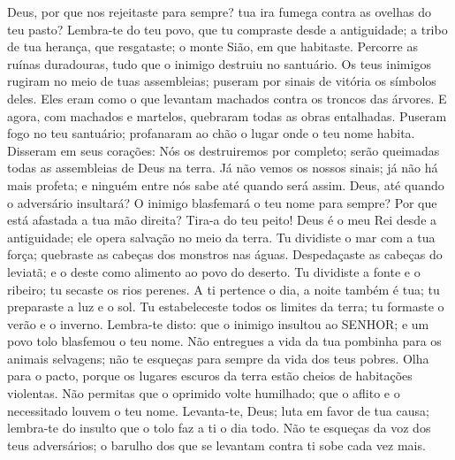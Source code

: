 
{\PP 
  Deus, por que nos rejeitaste para sempre?
{} tua ira fumega contra as ovelhas do teu pasto?
  Lembra-te do teu povo,
 que tu compraste desde a antiguidade; a tribo de tua herança, que resgataste; o monte Sião, em que habitaste.
  Percorre
 as ruínas duradouras, tudo que o inimigo destruiu no santuário.
  Os teus inimigos rugiram no meio de tuas assembleias; puseram por sinais de vitória os símbolos deles.
  Eles eram como o que levantam machados contra os troncos das árvores.
  E agora, com machados e martelos, quebraram todas as obras entalhadas.
  Puseram fogo no teu santuário; profanaram
{} ao chão o lugar onde o teu nome habita.
  Disseram em seus corações: Nós os destruiremos por completo; serão queimadas todas as assembleias de Deus na terra.
  Já não vemos os nossos sinais; já não há mais profeta; e ninguém entre nós sabe até quando será assim.
  Deus, até quando o adversário insultará? O inimigo blasfemará o teu nome para sempre?
  Por que está afastada a tua mão direita? Tira-a do teu peito!
  Deus é o meu Rei desde a antiguidade; ele opera salvação no meio da terra.
  Tu dividiste o mar com a tua força; quebraste as cabeças dos monstros nas águas.
  Despedaçaste as cabeças do leviatã; e o deste como alimento ao povo do deserto.
  Tu dividiste a fonte e o ribeiro; tu secaste os rios perenes.
  A ti pertence o dia, a noite também é tua; tu preparaste a luz e o sol.
  Tu estabeleceste todos os limites da terra; tu formaste o verão e o inverno.
  Lembra-te disto: que o inimigo insultou ao SENHOR; e um povo tolo blasfemou o teu nome.
  Não entregues a vida da tua pombinha para os animais selvagens; não te esqueças para sempre da vida dos teus pobres.
  Olha para o
{} pacto, porque os lugares escuros da terra estão cheios de habitações violentas.
  Não permitas que o oprimido volte humilhado; que o aflito e o necessitado louvem o teu nome.
  Levanta-te, Deus; luta em favor de tua causa; lembra-te do insulto que o tolo faz a ti o dia todo.
  Não te esqueças da voz dos teus adversários; o barulho dos que se levantam contra ti sobe cada vez mais.
\par }


